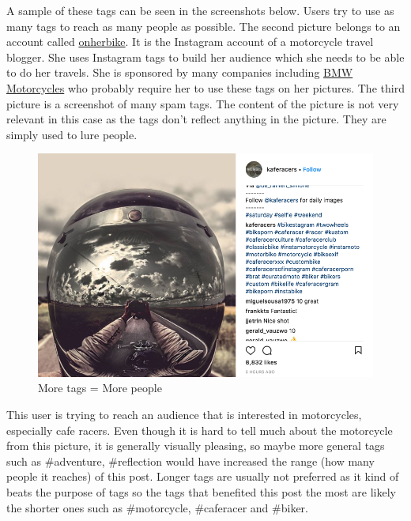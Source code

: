 \documentclass[10pt,letterpaper,bibliography=totoc]{scrartcl}
\begin{document}
A sample of these tags can be seen in the screenshots below. Users try to use as many tags to reach as many people as possible. The second picture belongs to an account called \href{www.instagram.com/onherbike}{onherbike}. It is the Instagram account of a motorcycle travel blogger. She uses Instagram tags to build her audience which she needs to be able to do her travels. She is sponsored by many companies including \href{www.bmw-motorrad.com/com/en/}{BMW Motorcycles} who probably require her to use these tags on her pictures. The third picture is a screenshot of many spam tags. The content of the picture is not very relevant in this case as the tags don't reflect anything in the picture. They are simply used to lure people.

\begin{figure}[h!]
\centering
\label{fig:insta-tag1}
\includegraphics[scale=.5]{insta-tag1.png}
\caption{More tags = More people}
\end{figure}

This user is trying to reach an audience that is interested in motorcycles, especially cafe racers. Even though it is hard to tell much about the motorcycle from this picture, it is generally visually pleasing, so maybe more general tags such as \#adventure, \#reflection would have increased the range (how many people it reaches) of this post. Longer tags are usually not preferred as it kind of beats the purpose of tags so the tags that benefited this post the most are likely the shorter ones such as \#motorcycle, \#caferacer and \#biker.
\end{document}
